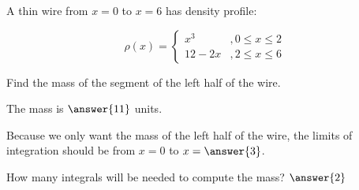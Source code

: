 \documentclass{ximera}
\author{Jim Talamo}
\begin{document}
\begin{exercise}
	A thin wire from $x=0$ to $x=6$ has density profile:
	
	\[
\rho(x) = \left\{ \begin{array}{cl} 
x^3 &, 0\leq x \leq 2 \\
12-2x &, 2 \leq x \leq 6
\end{array} \right.
\]

Find the mass of the segment of the left half of the wire.

The mass is $\answer{11}$ units.

\begin{hint}
Because we only want the mass of the left half of the wire, the limits of integration should be from $x=0$ to $x=\answer{3}$.  

How many integrals will be needed to compute the mass?  $\answer{2}$
\end{hint}

\end{exercise}
\end{document}
